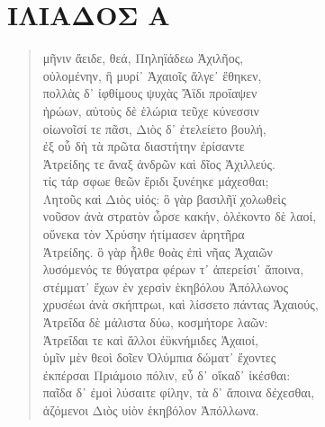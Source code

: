 ﻿%
\chapter*{\large\g ΙΛΙΑΔΟΣ Α}
%

\begin{Spacing}{1.5}
\begin{verse}  %
{\large\g μῆνιν ἄειδε, θεά, Πηληϊάδεω Ἀχιλῆος,  } \\
{\large\g οὐλομένην, ἣ μυρί᾽ Ἀχαιοῖς ἄλγε᾽ ἔθηκεν,  } \\
{\large\g πολλὰς δ᾽ ἰφθίμους ψυχὰς Ἄϊδι προΐαψεν   } \\
{\large\g  ἡρώων, αὐτοὺς δὲ ἑλώρια τεῦχε κύνεσσιν  } \\
{\large\g οἰωνοῖσί τε πᾶσι, Διὸς δ᾽ ἐτελείετο βουλή,   } \\
{\large\g ἐξ οὗ δὴ τὰ πρῶτα διαστήτην ἐρίσαντε   } \\
{\large\g Ἀτρείδης τε ἄναξ ἀνδρῶν καὶ δῖος Ἀχιλλεύς.  } \\
{\large\g τίς τάρ σφωε θεῶν ἔριδι ξυνέηκε μάχεσθαι;  } \\
{\large\g Λητοῦς καὶ Διὸς υἱός: ὃ γὰρ βασιλῆϊ χολωθεὶς  } \\
{\large\g νοῦσον ἀνὰ στρατὸν ὦρσε κακήν, ὀλέκοντο δὲ λαοί,  } \\
{\large\g οὕνεκα τὸν Χρύσην ἠτίμασεν ἀρητῆρα  } \\
{\large\g Ἀτρείδης. ὃ γὰρ ἦλθε θοὰς ἐπὶ νῆας Ἀχαιῶν  } \\
{\large\g λυσόμενός τε θύγατρα φέρων τ᾽ ἀπερείσι᾽ ἄποινα,  } \\
{\large\g στέμματ᾽ ἔχων ἐν χερσὶν ἑκηβόλου Ἀπόλλωνος  } \\
{\large\g χρυσέωι ἀνὰ σκήπτρωι, καὶ λίσσετο πάντας Ἀχαιούς,  } \\
{\large\g Ἀτρεΐδα δὲ μάλιστα δύω, κοσμήτορε λαῶν:  } \\
{\large\g  Ἀτρεΐδαι τε καὶ ἄλλοι ἐϋκνήμιδες Ἀχαιοί,   } \\
{\large\g ὑμῖν μὲν θεοὶ δοῖεν Ὀλύμπια δώματ᾽ ἔχοντες   } \\
{\large\g  ἐκπέρσαι Πριάμοιο πόλιν, εὖ δ᾽ οἴκαδ᾽ ἱκέσθαι:  } \\
{\large\g παῖδα δ᾽ ἐμοὶ λύσαιτε φίλην, τὰ δ᾽ ἄποινα δέχεσθαι,   } \\
{\large\g ἁζόμενοι Διὸς υἱὸν ἑκηβόλον Ἀπόλλωνα.   } \\

\end{verse}
\end{Spacing}
